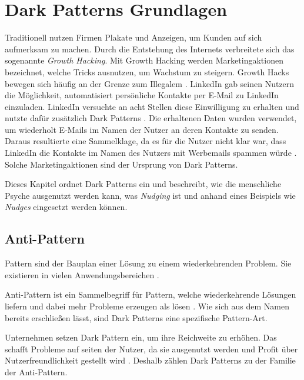 \documentclass[conference,compsoc,final,a4paper]{IEEEtran}
\begin{document}
\section{Dark Patterns Grundlagen}
\label{chap:Grundlagen}

Traditionell nutzen Firmen Plakate und Anzeigen, um Kunden auf sich aufmerksam zu machen. Durch die Entstehung des Internets verbreitete sich das sogenannte \textit{Growth Hacking}. Mit Growth Hacking werden Marketingaktionen bezeichnet, welche Tricks ausnutzen, um Wachstum zu steigern. Growth Hacks bewegen sich häufig an der Grenze zum Illegalem \autocite{Narayanan2020}. LinkedIn gab seinen Nutzern die Möglichkeit, automatisiert persönliche Kontakte per E-Mail zu LinkedIn einzuladen. LinkedIn versuchte an acht Stellen diese Einwilligung zu erhalten und nutzte dafür zusätzlich Dark Patterns \autocite{Schlosser2015}. Die erhaltenen Daten wurden verwendet, um wiederholt E-Mails im Namen der Nutzer an deren Kontakte zu senden. Daraus resultierte eine Sammelklage, da es für die Nutzer nicht klar war, dass LinkedIn die Kontakte im Namen des Nutzers mit Werbemails spammen würde \autocite{Strange2015}. Solche Marketingaktionen sind der Ursprung von Dark Patterns.

Dieses Kapitel ordnet Dark Patterns ein und beschreibt, wie die menschliche Psyche ausgenutzt werden kann, was \textit{Nudging} ist und anhand eines Beispiels wie \textit{Nudges} eingesetzt werden können.
\subsection{Anti-Pattern}
Pattern sind der Bauplan einer Lösung zu einem wiederkehrenden Problem. Sie existieren in vielen Anwendungsbereichen \autocite[S. 1]{MacDonald2019}.

Anti-Pattern ist ein Sammelbegriff für Pattern, welche wiederkehrende Lösungen liefern und dabei mehr Probleme erzeugen als lösen \autocite[S. 193-195]{MacDonald2019}. Wie sich aus dem Namen bereits erschließen lässt, sind Dark Patterns eine spezifische Pattern-Art.

Unternehmen setzen Dark Pattern ein, um ihre Reichweite zu erhöhen. Das schafft Probleme auf seiten der Nutzer, da sie ausgenutzt werden und Profit über Nutzerfreundlichkeit gestellt wird \autocite{Chivukula_2019}. Deshalb zählen Dark Patterns zu der Familie der Anti-Pattern.
\end{document}
